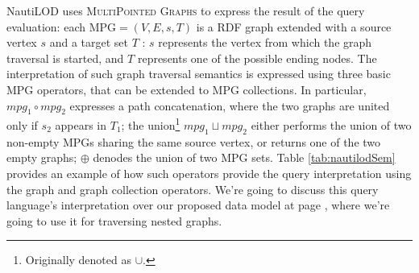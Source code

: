 
NautiLOD uses \textsc{MultiPointed Graphs} to express the result of the query evaluation: each MPG$=(V,E,s,T)$ is a RDF graph extended with a source vertex $s$ and a target set $T$ : $s$ represents the vertex from which the graph traversal is started, and $T$ represents one of the possible ending nodes. The interpretation of such graph traversal semantics is expressed using three basic MPG operators, that can be extended to MPG collections. In particular,  $mpg_1 \circ mpg_2$ expresses a path concatenation, where the two graphs are united only if $s_2$ appears in $T_1$; the union\footnote{Originally denoted as $\cup$.} $mpg_1 \sqcup mpg_2$ either performs the union of two non-empty MPGs sharing the same source vertex, or returns one of the two empty graphs; $\oplus$ denodes the union of two MPG sets. Table \ref{tab:nautilodSem} provides an example of how such operators provide the query interpretation using the graph and graph collection operators.  We're going to discuss this query language's interpretation over our proposed data model at page \pageref{ph:NTLImpl}, where we're going to use it for traversing nested graphs.
